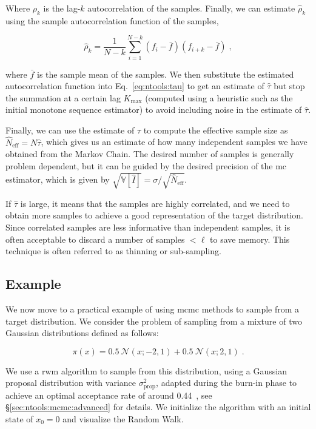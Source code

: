 Where $\rho_k$ is the lag-$k$ autocorrelation of the samples. Finally, we can estimate $\hat{\rho}_k$ using the sample autocorrelation function of the samples, 

\begin{equation}
  \hat{\rho}_k = \frac{1}{N-k} \sum_{i=1}^{N-k} (f_i - \bar{f})(f_{i+k} - \bar{f})\;,
\end{equation}

where $\bar{f}$ is the sample mean of the samples. We then substitute the estimated autocorrelation function into Eq.~\eqref{eq:ntools:tau} to get an estimate of $\hat{\tau}$ but stop the summation at a certain lag $K_{\mathrm{max}}$ (computed using a heuristic such as the initial monotone sequence estimator) to avoid including noise in the estimate of $\hat{\tau}$.

\smallskip
Finally, we can use the estimate of $\hat{\tau}$ to compute the effective sample size as $\hat{N}_{\mathrm{eff}} = N \hat{\tau}$, which gives us an estimate of how many independent samples we have obtained from the Markov Chain. The desired number of samples is generally problem dependent, but it can be guided by the desired precision of the \gls{mc} estimator, which is given by $\sqrt{\mathbb{V}[\hat{I}]} = \sigma / \sqrt{\hat{N}_{\mathrm{eff}}}$.

\smallskip
If $\hat{\tau}$ is large, it means that the samples are highly correlated, and we need to obtain more samples to achieve a good representation of the target distribution. Since correlated samples are less informative than independent samples, it is often acceptable to discard a number of samples $<\ell$ to save memory. This technique is often referred to as thinning or sub-sampling.

\subsection{Example}
\label{sec:ntools:mcmc:example}

We now move to a practical example of using \gls{mcmc} methods to sample from a target distribution. We consider the problem of sampling from a mixture of two Gaussian distributions defined as follows:

\begin{equation}
  \pi(x) = 0.5\ \mathcal{N}(x; -2, 1) + 0.5\ \mathcal{N}(x; 2, 1)\;.
\end{equation}

We use a \gls{rwm} algorithm to sample from this distribution, using a Gaussian proposal distribution with variance $\sigma_{\mathrm{prop}}^2$, adapted during the burn-in phase to achieve an optimal acceptance rate of around 0.44~\cite{uq_theory}, see \S\ref{sec:ntools:mcmc:advanced} for details. We initialize the algorithm with an initial state of $x_0 = 0$ and visualize the Random Walk.

